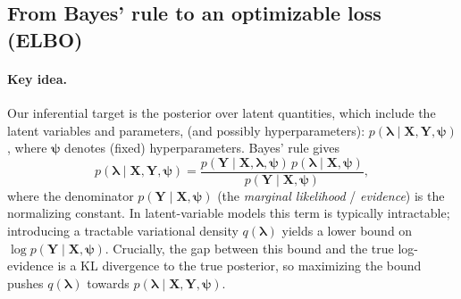 
\subsection{From Bayes' rule to an optimizable loss (ELBO)}

\paragraph{Key idea.}
Our inferential target is the posterior over latent quantities, which 
include the latent variables and parameters, (and possibly hyperparameters):
\(
p(\boldsymbol{\lambda}\mid \mathbf{X},\mathbf{Y},\boldsymbol{\psi})
\),
where \(\boldsymbol{\psi}\) denotes (fixed) hyperparameters. Bayes' rule gives
\begin{equation}
p(\boldsymbol{\lambda}\mid \mathbf{X},\mathbf{Y},\boldsymbol{\psi})
=
\frac{p(\mathbf{Y}\mid \mathbf{X},\boldsymbol{\lambda},\boldsymbol{\psi})\,p(\boldsymbol{\lambda}\mid \mathbf{X},\boldsymbol{\psi})}
     {p(\mathbf{Y}\mid \mathbf{X},\boldsymbol{\psi})},
\label{eq:bayes-posterior}
\end{equation}
where the denominator
\(
p(\mathbf{Y}\mid \mathbf{X},\boldsymbol{\psi})
\)
(the \emph{marginal likelihood} / \emph{evidence}) is the normalizing constant. In latent-variable models this term is typically intractable; introducing a tractable variational density \(q(\boldsymbol{\lambda})\) yields a lower bound on \(\log p(\mathbf{Y}\mid\mathbf{X},\boldsymbol{\psi})\). Crucially, the gap between this bound and the true log-evidence is a KL divergence to the true posterior, so maximizing the bound pushes \(q(\boldsymbol{\lambda})\) towards \(p(\boldsymbol{\lambda}\mid \mathbf{X},\mathbf{Y},\boldsymbol{\psi})\).

